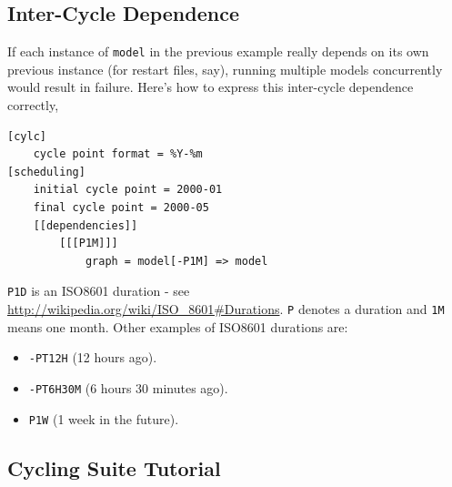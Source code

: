 \subsection{Inter-Cycle Dependence}

If each instance of \lstinline=model= in the previous example really depends
on its own previous instance (for restart files, say), running multiple
models concurrently would result in failure.  Here's how to express this
inter-cycle dependence correctly,

\begin{lstlisting}[language=suiterc]
[cylc]
    cycle point format = %Y-%m
[scheduling]
    initial cycle point = 2000-01
    final cycle point = 2000-05
    [[dependencies]]
        [[[P1M]]]
            graph = model[-P1M] => model
\end{lstlisting}

\lstinline=P1D= is an ISO8601 duration - see
    \url{http://wikipedia.org/wiki/ISO_8601#Durations}. \lstinline=P= denotes a
    duration and \lstinline=1M= means one month. Other examples of ISO8601
    durations are:
\begin{itemize}
    \item \lstinline{-PT12H} (12 hours ago).
    \item \lstinline{-PT6H30M} (6 hours 30 minutes ago).
    \item \lstinline{P1W} (1 week in the future).
\end{itemize}

\subsection{Cycling Suite Tutorial}

